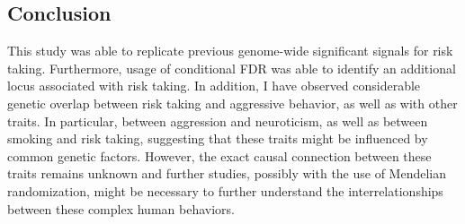 \subsection{Conclusion}
\label{sub:conclusion}

This study was able to replicate previous genome-wide significant signals for risk taking.
Furthermore, usage of conditional FDR was able to identify an additional locus associated with risk taking.
In addition, I have observed considerable genetic overlap between risk taking and aggressive behavior, as well as with other traits.
In particular, between aggression and neuroticism, as well as between smoking and risk taking, 
suggesting that these traits might be influenced by common genetic factors.
However, the exact causal connection between these traits remains unknown and further studies, possibly with the use of Mendelian randomization, might be necessary to further understand the interrelationships between these complex human behaviors. 
